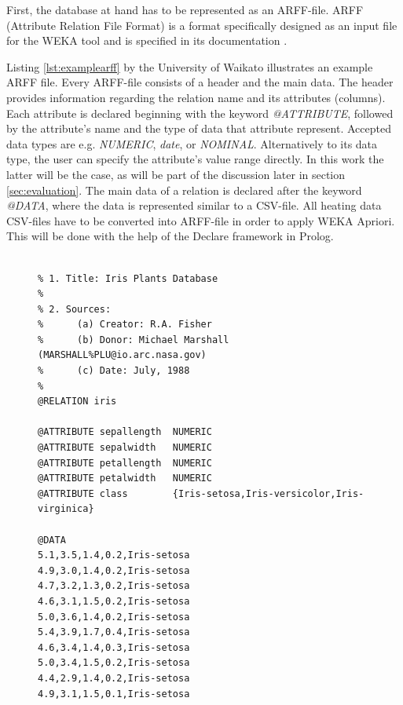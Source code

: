 \documentclass[bachelor,english]{info1thesis}
\begin{document}
First, the database at hand has to be represented as an ARFF-file. ARFF (Attribute Relation File Format) is a format specifically designed as an input file for the WEKA tool and is specified in its documentation \cite{docarff}. 

Listing \ref{lst:examplearff} by the University of Waikato illustrates an example ARFF file.
Every ARFF-file consists of a header and the main data. The header provides information regarding the relation name and its attributes (columns). Each attribute is declared beginning with the keyword \textit{@ATTRIBUTE}, followed by the attribute's name and the type of data that attribute represent. Accepted data types are e.g. \textit{NUMERIC}, \textit{date}, or \textit{NOMINAL}. Alternatively to its data type, the user can specify the attribute's value range directly. In this work the latter will be the case, as will be part of the discussion later in section \ref{sec:evaluation}. \newline The main data of a relation is declared after the keyword \textit{@DATA}, where the data is represented similar to a CSV-file. \newline
All heating data CSV-files have to be converted into ARFF-file in order to apply WEKA Apriori. This will be done with the help of the Declare framework in Prolog.

\vspace{0.2cm}

\begin{figure}
\begin{lstlisting}[style=arff, caption= Example ARFF file \cite{docarff}, label={lst:examplearff}]

% 1. Title: Iris Plants Database
% 
% 2. Sources:
%      (a) Creator: R.A. Fisher
%      (b) Donor: Michael Marshall (MARSHALL%PLU@io.arc.nasa.gov)
%      (c) Date: July, 1988
% 
@RELATION iris

@ATTRIBUTE sepallength  NUMERIC
@ATTRIBUTE sepalwidth   NUMERIC
@ATTRIBUTE petallength  NUMERIC
@ATTRIBUTE petalwidth   NUMERIC
@ATTRIBUTE class        {Iris-setosa,Iris-versicolor,Iris-virginica}

@DATA
5.1,3.5,1.4,0.2,Iris-setosa
4.9,3.0,1.4,0.2,Iris-setosa
4.7,3.2,1.3,0.2,Iris-setosa
4.6,3.1,1.5,0.2,Iris-setosa
5.0,3.6,1.4,0.2,Iris-setosa
5.4,3.9,1.7,0.4,Iris-setosa
4.6,3.4,1.4,0.3,Iris-setosa
5.0,3.4,1.5,0.2,Iris-setosa
4.4,2.9,1.4,0.2,Iris-setosa
4.9,3.1,1.5,0.1,Iris-setosa

\end{lstlisting}
\end{figure}
\vspace{0.2cm}
\end{document}
